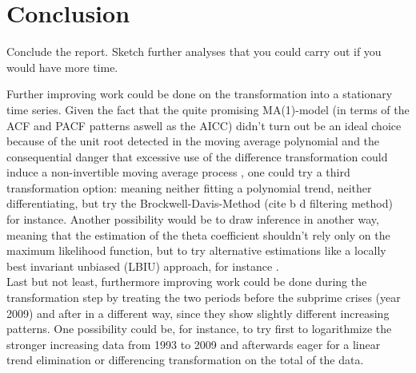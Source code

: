\documentclass[11pt,a4paper]{article}
\begin{document}
\section{Conclusion}
Conclude the report. Sketch further analyses that you could carry out if you would have more time.

Further improving work could be done on the transformation into a stationary time series. Given the fact that the quite promising MA(1)-model (in terms of the ACF and PACF patterns aswell as the AICC) didn't turn out be an ideal choice because of the unit root detected in the moving average polynomial and the consequential danger that excessive use of the difference transformation could induce a non-invertible moving average process \cite[~p.194]{bd02} \citep{plosser77}, one could try a third transformation option: meaning neither fitting a polynomial trend, neither differentiating, but try the Brockwell-Davis-Method (cite b d filtering method) for instance. Another possibility would be to draw inference in another way, meaning that the estimation of the theta coefficient shouldn't rely only on the maximum likelihood function, but to try alternative estimations like a locally best invariant unbiased (LBIU) approach, for instance \cite{davissong11}. \\
Last but not least, furthermore improving work could be done during the transformation step by treating the two periods before the subprime crises (year 2009) and after in a different way, since they show slightly different increasing patterns. One possibility could be, for instance, to try first to logarithmize the stronger increasing data from 1993 to 2009 and afterwards eager for a linear trend elimination or differencing transformation on the total of the data.



\end{document}
